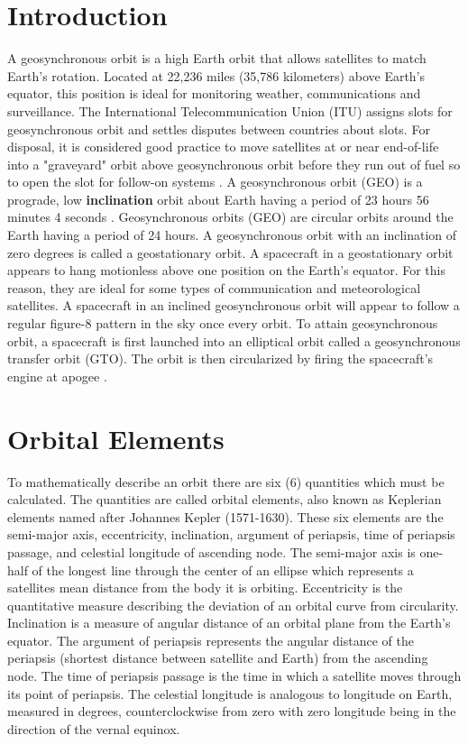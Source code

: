 \documentclass[conference]{IEEEtran}
\begin{document}
\section{Introduction}
A geosynchronous orbit is a high Earth orbit that allows satellites to match Earth's rotation. Located at 22,236 miles (35,786 kilometers) above Earth's equator, this position is ideal for monitoring weather, communications and surveillance. The International Telecommunication Union (ITU) assigns slots for geosynchronous orbit and settles disputes between countries about slots. For disposal, it is considered good practice to move satellites at or near end-of-life into a "graveyard" orbit above geosynchronous orbit before they run out of fuel so to open the slot for follow-on systems \cite{b1}. A geosynchronous orbit (GEO) is a prograde, low \textbf{inclination} orbit about Earth having a period of 23 hours 56 minutes 4 seconds \cite{b2}. Geosynchronous orbits (GEO) are circular orbits around the Earth having a period of 24 hours. A geosynchronous orbit with an inclination of zero degrees is called a geostationary orbit. A spacecraft in a geostationary orbit appears to hang motionless above one position on the Earth's equator. For this reason, they are ideal for some types of communication and meteorological satellites. A spacecraft in an inclined geosynchronous orbit will appear to follow a regular figure-8 pattern in the sky once every orbit. To attain geosynchronous orbit, a spacecraft is first launched into an elliptical orbit called a geosynchronous transfer orbit (GTO). The orbit is then circularized by firing the spacecraft's engine at apogee \cite{b3}.

\section{Orbital Elements}
To mathematically describe an orbit there are six (6) quantities which must be calculated. The quantities are called orbital elements, also known as Keplerian elements named after Johannes Kepler (1571-1630). These six elements are the semi-major axis, eccentricity, inclination, argument of periapsis, time of periapsis passage, and celestial longitude of ascending node. The semi-major axis is one-half of the longest line through the center of an ellipse which represents a satellites mean distance from the body it is orbiting. Eccentricity is the quantitative measure describing the deviation of an orbital curve from circularity. Inclination is a measure of angular distance of an orbital plane from the Earth's equator. The argument of periapsis represents the angular distance of the periapsis (shortest distance between satellite and Earth) from the ascending node. The time of periapsis passage is the time in which a satellite moves through its point of periapsis. The celestial longitude is analogous to longitude on Earth, measured in degrees, counterclockwise from zero with zero longitude being in the direction of the vernal equinox.
\end{document}
